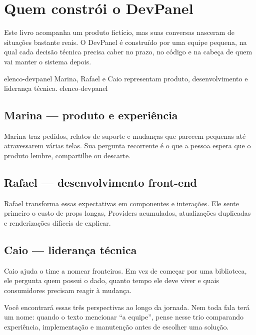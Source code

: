 \chapter*{Quem constrói o DevPanel}

Este livro acompanha um produto fictício, mas suas conversas nasceram de
situações bastante reais. O DevPanel é construído por uma equipe pequena, na
qual cada decisão técnica precisa caber no prazo, no código e na cabeça de quem
vai manter o sistema depois.

\imagemcapitulo
  {elenco-devpanel}
  {Marina, Rafael e Caio representam produto, desenvolvimento e liderança técnica.}
  {elenco-devpanel}

\section*{Marina — produto e experiência}

Marina traz pedidos, relatos de suporte e mudanças que parecem pequenas até
atravessarem várias telas. Sua pergunta recorrente é o que a pessoa espera que o
produto lembre, compartilhe ou descarte.

\section*{Rafael — desenvolvimento front-end}

Rafael transforma essas expectativas em componentes e interações. Ele sente
primeiro o custo de props longas, Providers acumulados, atualizações duplicadas
e renderizações difíceis de explicar.

\section*{Caio — liderança técnica}

Caio ajuda o time a nomear fronteiras. Em vez de começar por uma biblioteca, ele
pergunta quem possui o dado, quanto tempo ele deve viver e quais consumidores
precisam reagir à mudança.

Você encontrará essas três perspectivas ao longo da jornada. Nem toda fala terá
um nome: quando o texto mencionar ``a equipe'', pense nesse trio comparando
experiência, implementação e manutenção antes de escolher uma solução.

